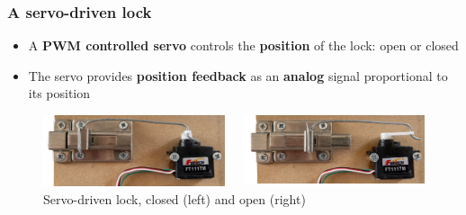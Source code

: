 \documentclass[handout]{beamer}
\begin{document}
\begin{frame}
  \frametitle{A servo-driven lock}

  \begin{itemize}
    \item<-1> A \textbf{PWM controlled servo} controls the \textbf{position} of
          the lock: open or closed
    \item The servo provides \textbf{position feedback} as an \textbf{analog}
          signal proportional to its position
  \end{itemize}

  \begin{figure}
    \centering
    \begin{columns}
      \begin{column}{0.5\textwidth}
        \includegraphics[width=\textwidth]{lock-closed.jpg}
      \end{column}
      \begin{column}{0.5\textwidth}
        \includegraphics[width=\textwidth]{lock-open.jpg}
      \end{column}
    \end{columns}
    \caption{Servo-driven lock, closed (left) and open (right)}
  \end{figure}
\end{frame}
\end{document}

